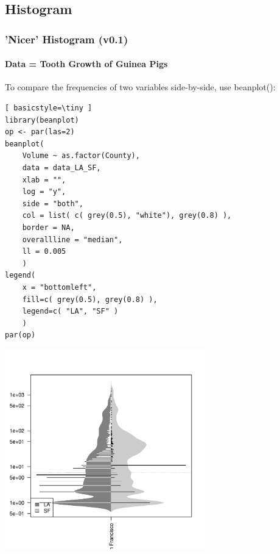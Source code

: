 
\subsection{Histogram}
\begin{frame}
\frametitle{'Nicer' Histogram (v0.1)}
  \framesubtitle{Data = Tooth Growth of Guinea Pigs}

To compare the frequencies of two variables side-by-side, use \ttfamily beanplot(): \normalfont

	\begin{lstlisting}[ basicstyle=\tiny ]
library(beanplot)
op <- par(las=2)
beanplot(
	Volume ~ as.factor(County), 
	data = data_LA_SF, 
	xlab = "",
	log = "y",
	side = "both", 
	col = list( c( grey(0.5), "white"), grey(0.8) ), 
	border = NA, 
	overallline = "median", 
	ll = 0.005
	)
legend(
	x = "bottomleft",
	fill=c( grey(0.5), grey(0.8) ), 
	legend=c( "LA", "SF" )
	)
par(op)
	\end{lstlisting}

        \begin{center}
	         \includegraphics[width=0.65\textwidth]{images/beanplot_v0.pdf}
        \end{center}

\end{frame}


%


